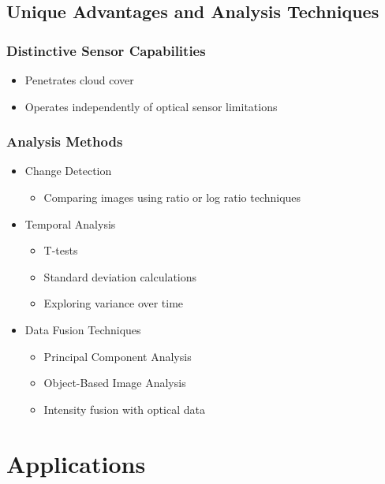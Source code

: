 \documentclass[
  letterpaper,
]{scrbook}
\providecommand{\tightlist}{%
  \setlength{\itemsep}{0pt}\setlength{\parskip}{0pt}}\usepackage{longtable,booktabs,array}
\begin{document}
\subsection{Unique Advantages and Analysis
Techniques}\label{unique-advantages-and-analysis-techniques}

\subsubsection{Distinctive Sensor
Capabilities}\label{distinctive-sensor-capabilities}

\begin{itemize}
\tightlist
\item
  Penetrates cloud cover
\item
  Operates independently of optical sensor limitations
\end{itemize}

\subsubsection{Analysis Methods}\label{analysis-methods}

\begin{itemize}
\item
  Change Detection

  \begin{itemize}
  \tightlist
  \item
    Comparing images using ratio or log ratio techniques
  \end{itemize}
\item
  Temporal Analysis

  \begin{itemize}
  \item
    T-tests
  \item
    Standard deviation calculations
  \item
    Exploring variance over time
  \end{itemize}
\item
  Data Fusion Techniques

  \begin{itemize}
  \item
    Principal Component Analysis
  \item
    Object-Based Image Analysis
  \item
    Intensity fusion with optical data
  \end{itemize}
\end{itemize}

\section{Applications}\label{applications-6}
\end{document}
